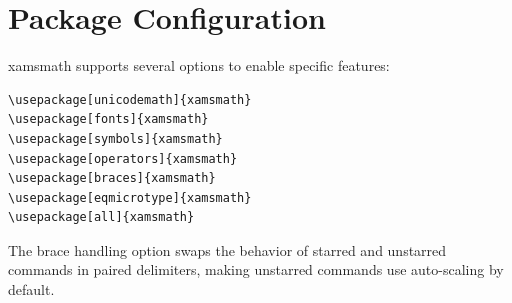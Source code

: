 \documentclass{article}
\begin{document}
\section{Package Configuration}

xamsmath supports several options to enable specific features:

\begin{verbatim}
\usepackage[unicodemath]{xamsmath}
\usepackage[fonts]{xamsmath}
\usepackage[symbols]{xamsmath}
\usepackage[operators]{xamsmath}
\usepackage[braces]{xamsmath}
\usepackage[eqmicrotype]{xamsmath}
\usepackage[all]{xamsmath}
\end{verbatim}

The brace handling option swaps the behavior of starred and unstarred commands in paired delimiters, making unstarred commands use auto-scaling by default.
\end{document}

